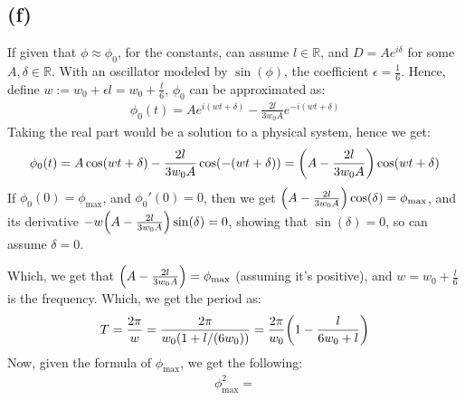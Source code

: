 \documentclass{article}
\newcommand{\RR}{\mathbb{R}}
\DeclarePairedDelimiter{\paran}{(}{)}%
\begin{document}
\subsection*{(f)}
If given that $\phi\approx \phi_0$, for the constants, can assume $l \in \RR$, and $D=Ae^{i\delta}$ for some $A,\delta\in\RR$. With an oscillator modeled by $\sin(\phi)$, the coefficient $\epsilon=\frac{1}{6}$. Hence, define $w := w_0+\epsilon l = w_0+\frac{l}{6}$, $\phi_0$ can be approximated as:
\begin{align}
    \phi_0(t) = Ae^{i(wt+\delta)}-\frac{2l}{3w_0A}e^{-i(wt+\delta)}
\end{align}
Taking the real part would be a solution to a physical system, hence we get:
\begin{align}
    \phi_0(t)=A\cos(wt+\delta)-\frac{2l}{3w_0A}\cos(-(wt+\delta)) = \paran*{A-\frac{2l}{3w_0A}}\cos(wt+\delta)
\end{align}
If $\phi_0(0) = \phi_{\max}$, and $\phi_0'(0)=0$, then we get $\paran*{A-\frac{2l}{3w_0A}}\cos(\delta) = \phi_{\max}$, and its derivative $-w\paran*{A-\frac{2l}{3w_0A}}\sin(\delta)=0$, showing that $\sin(\delta)=0$, so can assume $\delta = 0$.

Which, we get that $\paran*{A-\frac{2l}{3w_0A}}=\phi_{\max}$ (assuming it's positive), and $w=w_0+\frac{l}{6}$ is the frequency. Which, we get the period as:
\begin{align}
    T=\frac{2\pi}{w} = \frac{2\pi}{w_0(1+l/(6w_0))} = \frac{2\pi}{w_0}\paran*{1-\frac{l}{6w_0+l}}
\end{align}
Now, given the formula of $\phi_{\max}$, we get the following:
\begin{align}
    \phi_{\max}^2 =
\end{align}

\break
\end{document}
